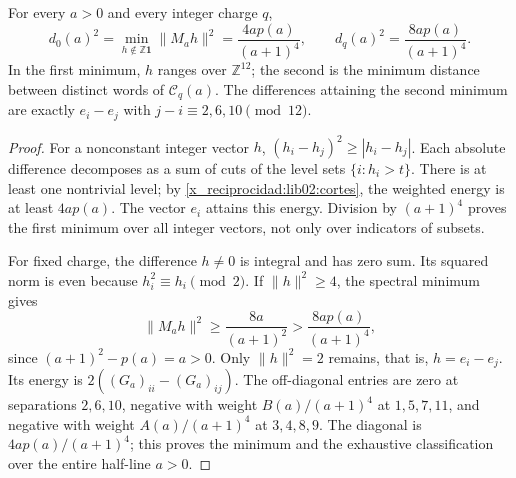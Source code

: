 \begin{theorem}
\label{x_reciprocidad:lib02:distancias}
For every \(a>0\) and every integer charge \(q\),
\begin{equation}
 d_0(a)^2=\min_{h\notin\mathbb Z\mathbf1}\|M_ah\|^2
 =\frac{4ap(a)}{(a+1)^4},\qquad
 d_q(a)^2=\frac{8ap(a)}{(a+1)^4}.
 \label{x_reciprocidad:lib02:distancias-exactas}
\end{equation}
In the first minimum, \(h\) ranges over \(\mathbb Z^{12}\); the second is the minimum distance between distinct words of \(\mathcal C_q(a)\). The differences attaining the second minimum are exactly \(e_i-e_j\) with \(j-i\equiv2,6,10\pmod{12}\).
\end{theorem}
\begin{proof}
For a nonconstant integer vector \(h\), \((h_i-h_j)^2\geq|h_i-h_j|\). Each absolute difference decomposes as a sum of cuts of the level sets \(\{i:h_i>t\}\). There is at least one nontrivial level; by \cref{x_reciprocidad:lib02:cortes}, the weighted energy is at least \(4ap(a)\). The vector \(e_i\) attains this energy. Division by \((a+1)^4\) proves the first minimum over all integer vectors, not only over indicators of subsets.

For fixed charge, the difference \(h\ne0\) is integral and has zero sum. Its squared norm is even because \(h_i^2\equiv h_i\pmod2\). If \(\|h\|^2\geq4\), the spectral minimum gives
\[
 \|M_ah\|^2\geq\frac{8a}{(a+1)^2}
 >\frac{8ap(a)}{(a+1)^4},
\]
since \((a+1)^2-p(a)=a>0\). Only \(\|h\|^2=2\) remains, that is, \(h=e_i-e_j\). Its energy is \(2((G_a)_{ii}-(G_a)_{ij})\). The off-diagonal entries are zero at separations \(2,6,10\), negative with weight \(B(a)/(a+1)^4\) at \(1,5,7,11\), and negative with weight \(A(a)/(a+1)^4\) at \(3,4,8,9\). The diagonal is \(4ap(a)/(a+1)^4\); this proves the minimum and the exhaustive classification over the entire half-line \(a>0\).
\end{proof}

